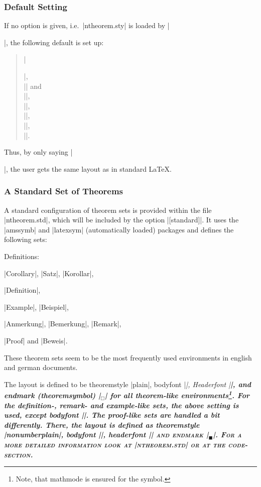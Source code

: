 \documentclass[11pt,oneside]{ltxdoc}
\theoremstyle{marginbreak}
\theoremstyle{changebreak}
\theoremstyle{change}
\theoremstyle{plain}
\theoremstyle{nonumberplain}
\begin{document}
\subsubsection{Default Setting}

If no option is given, i.e.\ |ntheorem.sty| is loaded by
|\usepackage{ntheorem.sty}|, the following default is set up:
\begin{quote} 
|\theoremstyle{plain}|,\\
|\theoremheaderfont{\normalfont\bfseries}| and\\
|\theorembodyfont{\itshape}|,\\
|\theoremseparator{}|,\\
||,\\
||, \\
|\theoremsymbol{}|.
\end{quote}
Thus, by only saying |\newtheorem{...}{...}|, the user gets
the same layout as in standard \LaTeX.


\subsubsection{A Standard Set of Theorems}\label{sec:standard}

A standard configuration of theorem sets is provided within
the file |ntheorem.std|, which will be included by the option
|[standard]|. It uses the |amssymb| and |latexsym| (automatically
loaded) packages and defines the following sets:
\begin{nlist}{Definitions:}
 \item[Theorems:] %
  |Corollary|, |Satz|, |Korollar|,
 \item[Definitions:] |Definition|,
 \item[Examples:] |Example|, |Beispiel|,
 \item[Remarks:] |Anmerkung|, |Bemerkung|, |Remark|,
 \item[Proofs:] |Proof| and |Beweis|.
\end{nlist}
These theorem sets seem to be the most frequently used environments 
in english and german
documents.

The layout is defined to be theoremstyle |plain|, bodyfont |\itshape|,
Headerfont |\bfseries|, and endmark (theoremsymbol)
|\ensuremath{_\Box}| for all theorem-like environments\footnote{Note, 
that mathmode is ensured for the symbol.}.
For the definition-, remark- and example-like sets,
the above setting is used, except bodyfont |\upshape|.
The proof-like sets are handled a bit differently. There, the layout 
is defined as theoremstyle |nonumberplain|, bodyfont |\upshape|,
headerfont |\scshape| and endmark |\ensuremath{_\blacksquare}|. 
For a more detailed information look at 
|ntheorem.std| or at the code-section.
\end{document}
